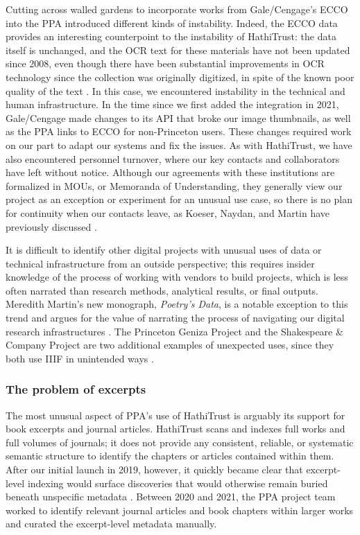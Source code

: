 \documentclass{anthology-ch}         %
\begin{document}
Cutting across walled gardens to incorporate works from Gale/Cengage’s ECCO into the PPA introduced different kinds of instability. Indeed, the ECCO data provides an interesting counterpoint to the instability of HathiTrust: the data itself is unchanged, and the OCR text for these materials have not been updated since 2008, even though there have been substantial improvements in OCR technology since the collection was originally digitized, in spite of the known poor quality of the text \cite{hill_quantifying_2019}. In this case, we encountered instability in the technical and human infrastructure. In the time since we first added the integration in 2021, Gale/Cengage made changes to its API that broke our image thumbnails, as well as the PPA links to ECCO for non-Princeton users. These changes required work on our part to adapt our systems and fix the issues. As with HathiTrust, we have also encountered personnel turnover, where our key contacts and collaborators have left without notice. Although our agreements with these institutions are formalized in MOUs, or Memoranda of Understanding, they generally view our project as an exception or experiment for an unusual use case, so there is no plan for continuity when our contacts leave, as Koeser, Naydan, and Martin have previously discussed \cite{naydan_beyond_2024}.

It is difficult to identify other digital projects with unusual uses of data or technical infrastructure from an outside perspective; this requires insider knowledge of the process of working with vendors to build projects, which is less often narrated than research methods, analytical results, or final outputs. Meredith Martin’s new monograph, \textit{Poetry’s Data}, is a notable exception to this trend and argues for the value of narrating the process of navigating our digital research infrastructures \cite{martin_poetrys_2025}. The Princeton Geniza Project and the Shakespeare \& Company Project are two additional examples of unexpected uses, since they both use IIIF in unintended ways \cite{noauthor_princeton_nodate, noauthor_shakespeare_2020}. 

\subsubsection{The problem of excerpts}

The most unusual aspect of PPA’s use of HathiTrust is arguably its support for book excerpts and journal articles. HathiTrust scans and indexes full works and full volumes of journals; it does not provide any consistent, reliable, or systematic semantic structure to identify the chapters or articles contained within them. After our initial launch in 2019, however, it quickly became clear that excerpt-level indexing would surface discoveries that would otherwise remain buried beneath unspecific metadata \cite{naydan_book_2024}. Between 2020 and 2021, the PPA project team worked to identify relevant journal articles and book chapters within larger works and curated the excerpt-level metadata manually. 
\end{document}
